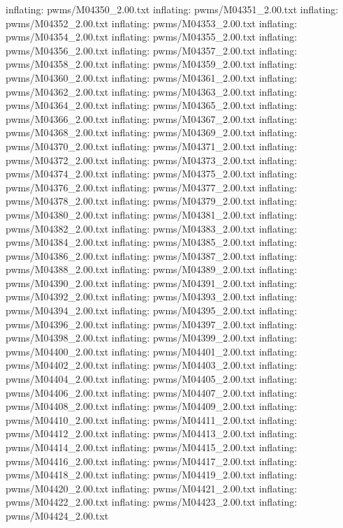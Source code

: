 \documentclass[letterpaper,10pt,english]{sphinxmanual}
\begin{document}
{\begin{sphinxVerbatim}[commandchars=\\\{\}]
  inflating: pwms/M04350\_2.00.txt
  inflating: pwms/M04351\_2.00.txt
  inflating: pwms/M04352\_2.00.txt
  inflating: pwms/M04353\_2.00.txt
  inflating: pwms/M04354\_2.00.txt
  inflating: pwms/M04355\_2.00.txt
  inflating: pwms/M04356\_2.00.txt
  inflating: pwms/M04357\_2.00.txt
  inflating: pwms/M04358\_2.00.txt
  inflating: pwms/M04359\_2.00.txt
  inflating: pwms/M04360\_2.00.txt
  inflating: pwms/M04361\_2.00.txt
  inflating: pwms/M04362\_2.00.txt
  inflating: pwms/M04363\_2.00.txt
  inflating: pwms/M04364\_2.00.txt
  inflating: pwms/M04365\_2.00.txt
  inflating: pwms/M04366\_2.00.txt
  inflating: pwms/M04367\_2.00.txt
  inflating: pwms/M04368\_2.00.txt
  inflating: pwms/M04369\_2.00.txt
  inflating: pwms/M04370\_2.00.txt
  inflating: pwms/M04371\_2.00.txt
  inflating: pwms/M04372\_2.00.txt
  inflating: pwms/M04373\_2.00.txt
  inflating: pwms/M04374\_2.00.txt
  inflating: pwms/M04375\_2.00.txt
  inflating: pwms/M04376\_2.00.txt
  inflating: pwms/M04377\_2.00.txt
  inflating: pwms/M04378\_2.00.txt
  inflating: pwms/M04379\_2.00.txt
  inflating: pwms/M04380\_2.00.txt
  inflating: pwms/M04381\_2.00.txt
  inflating: pwms/M04382\_2.00.txt
  inflating: pwms/M04383\_2.00.txt
  inflating: pwms/M04384\_2.00.txt
  inflating: pwms/M04385\_2.00.txt
  inflating: pwms/M04386\_2.00.txt
  inflating: pwms/M04387\_2.00.txt
  inflating: pwms/M04388\_2.00.txt
  inflating: pwms/M04389\_2.00.txt
  inflating: pwms/M04390\_2.00.txt
  inflating: pwms/M04391\_2.00.txt
  inflating: pwms/M04392\_2.00.txt
  inflating: pwms/M04393\_2.00.txt
  inflating: pwms/M04394\_2.00.txt
  inflating: pwms/M04395\_2.00.txt
  inflating: pwms/M04396\_2.00.txt
  inflating: pwms/M04397\_2.00.txt
  inflating: pwms/M04398\_2.00.txt
  inflating: pwms/M04399\_2.00.txt
  inflating: pwms/M04400\_2.00.txt
  inflating: pwms/M04401\_2.00.txt
  inflating: pwms/M04402\_2.00.txt
  inflating: pwms/M04403\_2.00.txt
  inflating: pwms/M04404\_2.00.txt
  inflating: pwms/M04405\_2.00.txt
  inflating: pwms/M04406\_2.00.txt
  inflating: pwms/M04407\_2.00.txt
  inflating: pwms/M04408\_2.00.txt
  inflating: pwms/M04409\_2.00.txt
  inflating: pwms/M04410\_2.00.txt
  inflating: pwms/M04411\_2.00.txt
  inflating: pwms/M04412\_2.00.txt
  inflating: pwms/M04413\_2.00.txt
  inflating: pwms/M04414\_2.00.txt
  inflating: pwms/M04415\_2.00.txt
  inflating: pwms/M04416\_2.00.txt
  inflating: pwms/M04417\_2.00.txt
  inflating: pwms/M04418\_2.00.txt
  inflating: pwms/M04419\_2.00.txt
  inflating: pwms/M04420\_2.00.txt
  inflating: pwms/M04421\_2.00.txt
  inflating: pwms/M04422\_2.00.txt
  inflating: pwms/M04423\_2.00.txt
  inflating: pwms/M04424\_2.00.txt

\end{sphinxVerbatim}}
\end{document}
